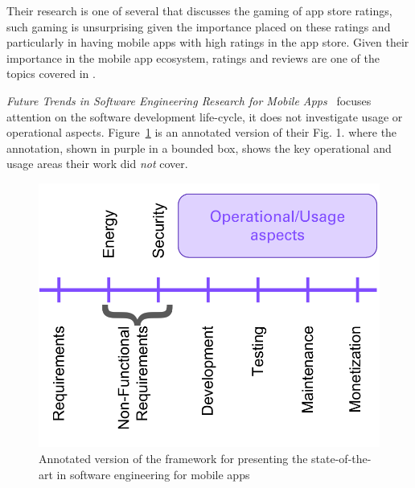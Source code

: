 Their research is one of several that discusses the gaming of app store ratings, such gaming is unsurprising given the importance placed on these ratings and particularly in having mobile apps with high ratings in the app store. Given their importance in the mobile app ecosystem, ratings and reviews are one of the topics covered in .

\emph{Future Trends in Software Engineering Research for Mobile Apps}~ focuses attention on the software development life-cycle, it does not investigate usage or operational aspects. Figure~\ref{fig:nagappan2016_future_trends_in_sw_eng_for_mobile_apps_figure_1_annotated} is an annotated version of their Fig. 1.  where the annotation, shown in purple in a bounded box, shows the key operational and usage areas their work did \emph{not} cover. 


\begin{figure}
    \centering
    \includegraphics[width=\linewidth]{images/my/framework-for-presenting-the-state-of-the-art-in-sw-end-for-mobile-apps.pdf}
    \caption[Framework for presenting the state-of-the-art in software engineering for mobile apps, adapted from~\cite{nagappan2016_future_trends_in_sw_eng_for_mobile_apps}]{Annotated version of the framework for presenting the state-of-the-art in software engineering for mobile apps~\cite{nagappan2016_future_trends_in_sw_eng_for_mobile_apps}}
    \label{fig:nagappan2016_future_trends_in_sw_eng_for_mobile_apps_figure_1_annotated}
\end{figure}


